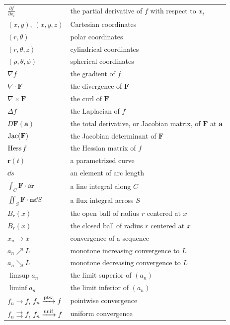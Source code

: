 {\begin{longtable}{@{}L{0.27\textwidth}L{0.65\textwidth}@{}}
        $\displaystyle\frac{\partial f}{\partial x_i}$ & the partial derivative of $f$ with respect to $x_i$ \\
        $(x,y)$, $(x,y,z)$ & Cartesian coordinates \\
        $(r,\theta)$ & polar coordinates \\
        $(r,\theta,z)$ & cylindrical coordinates \\
        $(\rho,\theta,\phi)$ & spherical coordinates \\
        $\nabla f$ & the gradient of $f$ \\
        $\nabla\cdot\mathbf{F}$ & the divergence of $\mathbf{F}$ \\
        $\nabla\times\mathbf{F}$ & the curl of $\mathbf{F}$ \\
        $\Delta f$ & the Laplacian of $f$ \\
        $D\mathbf{F}(\mathbf{a})$ & the total derivative, or Jacobian matrix, of $\mathbf{F}$ at $\mathbf{a}$ \\
        $\operatorname{Jac}(\mathbf{F})$ & the Jacobian determinant of $\mathbf{F}$ \\
        $\operatorname{Hess} f$ & the Hessian matrix of $f$ \\
        $\mathbf{r}(t)$ & a parametrized curve \\
        $\dd s$ & an element of arc length \\
        $\displaystyle\int_C\mathbf{F}\cdot\dd\mathbf{r}$ & a line integral along $C$ \\
        $\displaystyle\iint_S\mathbf{F}\cdot\mathbf{n}\dd S$ & a flux integral across $S$ \\
        $B_r(x)$ & the open ball of radius $r$ centered at $x$ \\
        $\overline{B}_r(x)$ & the closed ball of radius $r$ centered at $x$ \\
        $x_n\to x$ & convergence of a sequence \\
        $a_n\nearrow L$ & monotone increasing convergence to $L$ \\
        $a_n\searrow L$ & monotone decreasing convergence to $L$ \\
        $\limsup a_n$ & the limit superior of $(a_n)$ \\
        $\liminf a_n$ & the limit inferior of $(a_n)$ \\
        $f_n\to f$, $f_n\xrightarrow{\mathrm{ptw}} f$ & pointwise convergence \\
        $f_n\rightrightarrows f$, $f_n\xrightarrow{\mathrm{unif}} f$ & uniform convergence \\

\end{longtable}}
